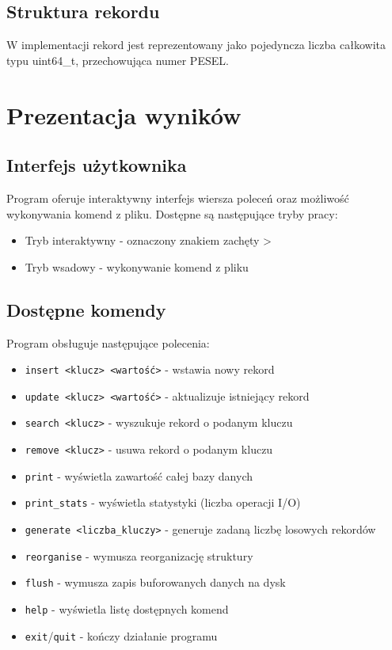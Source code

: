 \documentclass[12pt]{article}
\begin{document}
\subsection{Struktura rekordu}
W implementacji rekord jest reprezentowany jako pojedyncza liczba całkowita typu uint64\_t, przechowująca numer PESEL.

\section{Prezentacja wyników}
\subsection{Interfejs użytkownika}
Program oferuje interaktywny interfejs wiersza poleceń oraz możliwość wykonywania komend z pliku. Dostępne są następujące tryby pracy:
\begin{itemize}
    \item Tryb interaktywny - oznaczony znakiem zachęty >
    \item Tryb wsadowy - wykonywanie komend z pliku
\end{itemize}

\subsection{Dostępne komendy}
Program obsługuje następujące polecenia:
\begin{itemize}
    \item \texttt{insert <klucz> <wartość>} - wstawia nowy rekord
    \item \texttt{update <klucz> <wartość>} - aktualizuje istniejący rekord
    \item \texttt{search <klucz>} - wyszukuje rekord o podanym kluczu
    \item \texttt{remove <klucz>} - usuwa rekord o podanym kluczu
    \item \texttt{print} - wyświetla zawartość całej bazy danych
    \item \texttt{print\_stats} - wyświetla statystyki (liczba operacji I/O)
    \item \texttt{generate <liczba\_kluczy>} - generuje zadaną liczbę losowych rekordów
    \item \texttt{reorganise} - wymusza reorganizację struktury
    \item \texttt{flush} - wymusza zapis buforowanych danych na dysk
    \item \texttt{help} - wyświetla listę dostępnych komend
    \item \texttt{exit}/\texttt{quit} - kończy działanie programu
\end{itemize}
\end{document}
